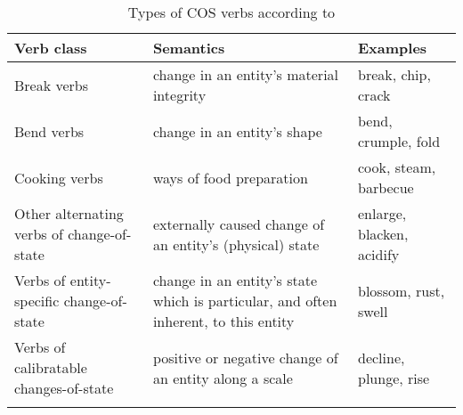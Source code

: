 \begin{table} []
    \caption[Types of COS verbs]{\label{tab:cos}Types of COS verbs according to \citet[240--248]{Levin.1993}} 
    \begin{tabular}{p{3.5cm}<{\raggedright} p{4.5cm}<{\raggedright} p{3cm}<{\raggedright}}
      \lsptoprule
      Verb class
      & Semantics
      & Examples \\ 
      \midrule
Break verbs
      & change in an entity's material integrity~~~
      & {break, chip, crack} \\
      \addlinespace
      Bend verbs
      & change in an entity's shape
      & {bend, crumple, fold} \\
      \addlinespace
      Cooking verbs
      & ways of food preparation
      & {cook, steam, barbecue} \\
      \addlinespace
      Other alternating verbs of change-of-state
      & externally caused change of an entity's (physical) state
      & {enlarge, blacken, acidify} \\
      \addlinespace
      Verbs of entity-specific change-of-state 
      & change in an entity's state which is particular, and often inherent, to this entity
      & {blossom, rust, swell} \\
      \addlinespace
      Verbs of calibratable changes-of-state
      & positive or negative change of an entity along a scale
      & {decline, plunge, rise} \\      
      \lspbottomrule
    \end{tabular}
\end{table}

